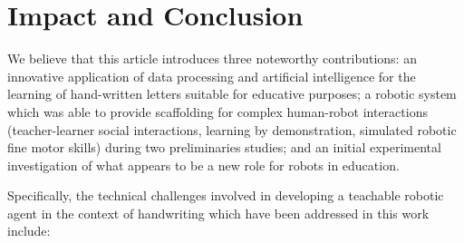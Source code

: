 \documentclass{sig-alternate}
\begin{document}
%


\addtolength{\textheight}{-6.3cm}   %

\section{Impact and Conclusion}\label{sec:conclusions}

We believe that this article introduces three noteworthy contributions: an
innovative application of data processing and artificial intelligence for the
learning of hand-written letters suitable for educative purposes; a robotic
system which was able to provide scaffolding for complex human-robot
interactions (teacher-learner social interactions, learning by demonstration,
simulated robotic fine motor skills) during two preliminaries studies; and an
initial experimental investigation of what appears to be a new role for robots
in education.

Specifically, the technical challenges involved in developing a teachable
robotic agent in the context of handwriting which have been addressed in this
work include:
\end{document}
